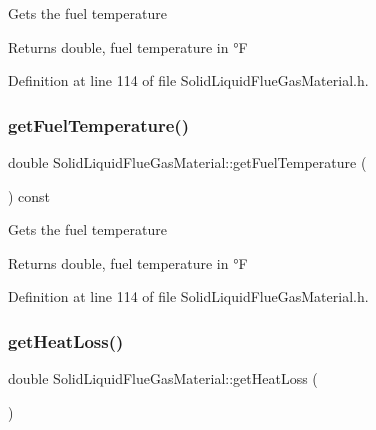Gets the fuel temperature \begin{DoxyReturn}{Returns}
double, fuel temperature in °F 
\end{DoxyReturn}


Definition at line 114 of file Solid\+Liquid\+Flue\+Gas\+Material.\+h.

\mbox{\label{class_solid_liquid_flue_gas_material_a629ecc7104b6bfbb696d9478c4b48e7a}} 
\subsubsection{\texorpdfstring{get\+Fuel\+Temperature()}{getFuelTemperature()}\hspace{0.1cm}{\footnotesize\ttfamily [3/3]}}
{\footnotesize\ttfamily double Solid\+Liquid\+Flue\+Gas\+Material\+::get\+Fuel\+Temperature (\begin{DoxyParamCaption}{ }\end{DoxyParamCaption}) const\hspace{0.3cm}{\ttfamily [inline]}}

Gets the fuel temperature \begin{DoxyReturn}{Returns}
double, fuel temperature in °F 
\end{DoxyReturn}


Definition at line 114 of file Solid\+Liquid\+Flue\+Gas\+Material.\+h.

\mbox{\label{class_solid_liquid_flue_gas_material_af7d36673e49f9b5eb631fc04227883d6}} 
\subsubsection{\texorpdfstring{get\+Heat\+Loss()}{getHeatLoss()}\hspace{0.1cm}{\footnotesize\ttfamily [1/3]}}
{\footnotesize\ttfamily double Solid\+Liquid\+Flue\+Gas\+Material\+::get\+Heat\+Loss (\begin{DoxyParamCaption}{ }\end{DoxyParamCaption})}

